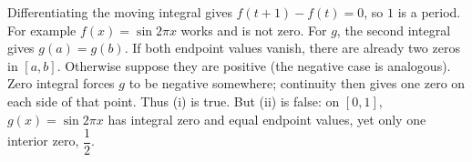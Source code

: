 Differentiating the moving integral gives $f(t+1)-f(t)=0$, so $1$ is a period. For example $f(x)=\sin2\pi x$ works and is not zero. For $g$, the second integral gives $g(a)=g(b)$. If both endpoint values vanish, there are already two zeros in $[a,b]$. Otherwise suppose they are positive (the negative case is analogous). Zero integral forces $g$ to be negative somewhere; continuity then gives one zero on each side of that point. Thus (i) is true. But (ii) is false: on $[0,1]$, $g(x)=\sin2\pi x$ has integral zero and equal endpoint values, yet only one interior zero, $\dfrac{1}{2}$.
